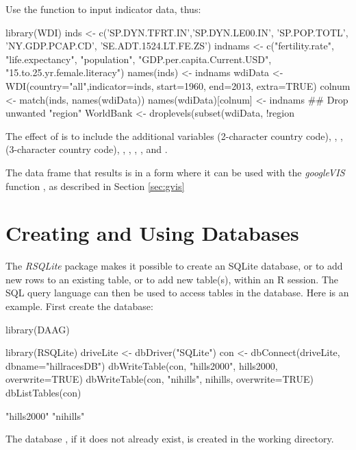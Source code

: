 Use the function  to input indicator data, thus:
\begin{fullwidth}
\begin{Schunk}
\begin{Sinput}
library(WDI)
inds <- c('SP.DYN.TFRT.IN','SP.DYN.LE00.IN', 'SP.POP.TOTL',
 'NY.GDP.PCAP.CD', 'SE.ADT.1524.LT.FE.ZS')
indnams <- c("fertility.rate", "life.expectancy", "population",
             "GDP.per.capita.Current.USD", "15.to.25.yr.female.literacy")
names(inds) <- indnams
wdiData <- WDI(country="all",indicator=inds, start=1960, end=2013, extra=TRUE)
colnum <- match(inds, names(wdiData))
names(wdiData)[colnum] <- indnams
## Drop unwanted "region"
WorldBank <- droplevels(subset(wdiData, !region %in% "Aggregates"))
\end{Sinput}
\end{Schunk}
\end{fullwidth}
The effect of  is to include the additional variables
 (2-character country code), , ,
 (3-character country code), ,
, , ,  and
.

The data frame  that results is in a form where it can
be used with the {\em googleVIS} function ,
as described in Section \ref{sec:gvis}

\section{Creating and Using Databases}\label{ss:dbase}

The \textit{RSQLite} package makes it possible to create an
SQLite database, or to add new rows to an existing table,
or to add new table(s), within an R session. The SQL query
language can then be used to access tables in the database.
Here is an example. First create the database:

\noindent
\begin{Schunk}
\begin{Sinput}
library(DAAG)
\end{Sinput}
\begin{Sinput}
library(RSQLite)
driveLite <- dbDriver("SQLite")
con <- dbConnect(driveLite, dbname="hillracesDB")
dbWriteTable(con, "hills2000", hills2000,
             overwrite=TRUE)
dbWriteTable(con, "nihills", nihills,
             overwrite=TRUE)
dbListTables(con)
\end{Sinput}
\begin{Soutput}
[1] "hills2000" "nihills"  
\end{Soutput}
\end{Schunk}
The database , if it does not already exist,
is created in the working directory.

